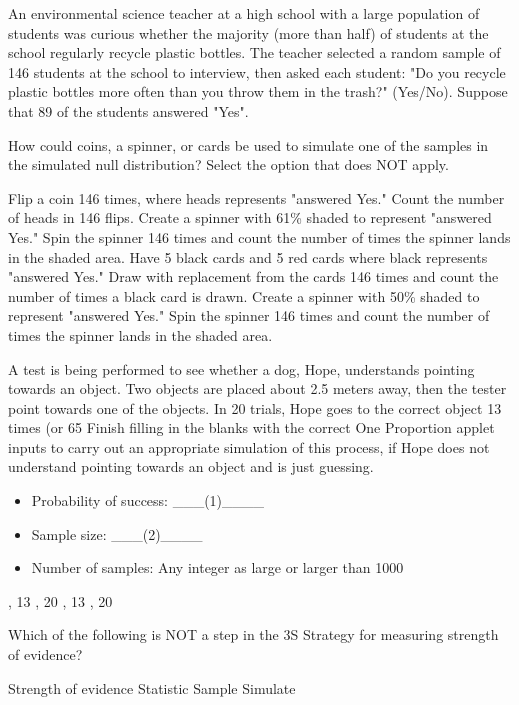\documentclass[answers]{exam}
\begin{document}
\begin{questions}
		
		\question An environmental science teacher at a high school with a large population of students was curious whether the majority (more than half) of students at the school regularly recycle plastic bottles. The teacher selected a random sample of 146 students at the school to interview, then asked each student: "Do you recycle plastic bottles more often than you throw them in the trash?" (Yes/No). Suppose that 89 of the students answered "Yes".
		
		How could coins, a spinner, or cards be used to simulate one of the samples in the simulated null distribution? Select the option that does NOT apply.
		\begin{choices}
			\choice Flip a coin 146 times, where heads represents "answered Yes." Count the number of heads in 146 flips.
			\correctchoice Create a spinner with 61\% shaded to represent "answered Yes." Spin the spinner 146 times and count the number of times the spinner lands in the shaded area.
			\choice Have 5 black cards and 5 red cards where black represents "answered Yes."  Draw with replacement from the cards 146 times and count the number of times a black card is drawn.
			\choice Create a spinner with 50\% shaded to represent "answered Yes." Spin the spinner 146 times and count the number of times the spinner lands in the shaded area.
		\end{choices}
		
		\question A test is being performed to see whether a dog, Hope, understands pointing towards an object. Two objects are placed about 2.5 meters away, then the tester point towards one of the objects. In 20 trials, Hope goes to the correct object 13 times (or 65%
		Finish filling in the blanks with the correct One Proportion applet inputs to carry out an appropriate simulation of this process, if Hope does not understand pointing towards an object and is just guessing.
		\begin{itemize}
			\item Probability of success: \_\_\_(1)\_\_\_\_
			\item Sample size: \_\_\_(2)\_\_\_\_
			\item Number of samples: Any integer as large or larger than 1000
		\end{itemize}
		\begin{oneparchoices}
			, 13
			, 20
			, 13
			, 20
		\end{oneparchoices}
		
		\question Which of the following is NOT a step in the 3S Strategy for measuring strength of evidence?
		
		\begin{oneparchoices}
			\choice Strength of evidence
			\choice Statistic
			\correctchoice Sample
			\choice Simulate
		\end{oneparchoices}
		
	\end{questions}
\end{document}
